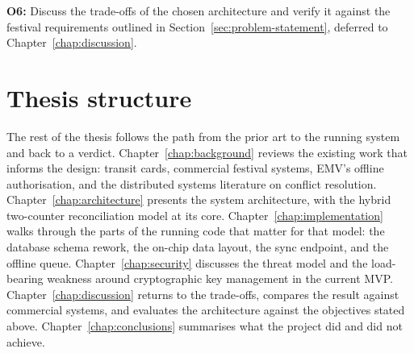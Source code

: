 \textbf{O6:} Discuss the trade-offs of the chosen architecture and verify it against the festival requirements outlined in Section~\ref{sec:problem-statement}, deferred to Chapter~\ref{chap:discussion}.

\section{Thesis structure}
\label{sec:thesis-structure}

The rest of the thesis follows the path from the prior art to the running system and back to a verdict. Chapter~\ref{chap:background} reviews the existing work that informs the design: transit cards, commercial festival systems, EMV's offline authorisation, and the distributed systems literature on conflict resolution. Chapter~\ref{chap:architecture} presents the system architecture, with the hybrid two-counter reconciliation model at its core. Chapter~\ref{chap:implementation} walks through the parts of the running code that matter for that model: the database schema rework, the on-chip data layout, the sync endpoint, and the offline queue. Chapter~\ref{chap:security} discusses the threat model and the load-bearing weakness around cryptographic key management in the current MVP. Chapter~\ref{chap:discussion} returns to the trade-offs, compares the result against commercial systems, and evaluates the architecture against the objectives stated above. Chapter~\ref{chap:conclusions} summarises what the project did and did not achieve.

